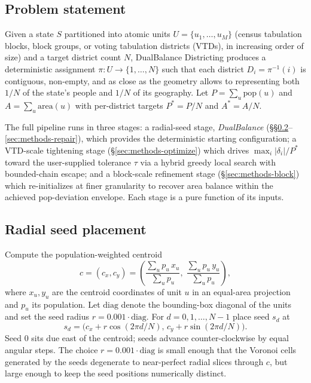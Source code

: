 \subsection{Problem statement}

Given a state $S$ partitioned into atomic units
$U = \{u_1, \ldots, u_M\}$ (census tabulation blocks, block groups,
or voting tabulation districts (VTDs), in increasing order of size) and
a target district count $N$, DualBalance Districting produces a
deterministic assignment $\pi : U \to \{1, \ldots, N\}$ such that
each district $D_i = \pi^{-1}(i)$ is contiguous, non-empty, and as
close as the geometry allows to representing both $1/N$ of the
state's people and $1/N$ of its geography. Let
$P = \sum_u \mathrm{pop}(u)$ and $A = \sum_u \mathrm{area}(u)$ with
per-district targets $P^* = P/N$ and $A^* = A/N$.

The full pipeline runs in three stages: a radial-seed stage,
\emph{DualBalance} (\S\S\ref{sec:methods-seeds}--\ref{sec:methods-repair}),
which provides the deterministic starting configuration; a
VTD-scale tightening stage (\S\ref{sec:methods-optimize}) which
drives $\max_i |\delta_i|/P^{*}$ toward the user-supplied tolerance
$\tau$ via a hybrid greedy local search with bounded-chain escape;
and a block-scale refinement stage (\S\ref{sec:methods-block})
which re-initializes at finer granularity to recover area balance
within the achieved pop-deviation envelope. Each stage is a pure
function of its inputs.

\subsection{Radial seed placement}
\label{sec:methods-seeds}

Compute the population-weighted centroid
\[
  c = (c_x, c_y) =
  \left(
    \frac{\sum_u p_u\,x_u}{\sum_u p_u},\;
    \frac{\sum_u p_u\,y_u}{\sum_u p_u}
  \right),
\]
where $x_u, y_u$ are the centroid coordinates of unit $u$ in an
equal-area projection and $p_u$ its population. Let $\mathrm{diag}$
denote the bounding-box diagonal of the units and set the seed
radius $r = 0.001 \cdot \mathrm{diag}$. For $d = 0, 1, \ldots, N-1$
place seed $s_d$ at
\[
  s_d = \bigl(c_x + r\cos(2\pi d/N),\, c_y + r\sin(2\pi d/N)\bigr).
\]
Seed 0 sits due east of the centroid; seeds advance counter-clockwise
by equal angular steps. The choice $r = 0.001 \cdot \mathrm{diag}$ is
small enough that the Voronoi cells generated by the seeds degenerate
to near-perfect radial slices through $c$, but large enough to keep
the seed positions numerically distinct.

